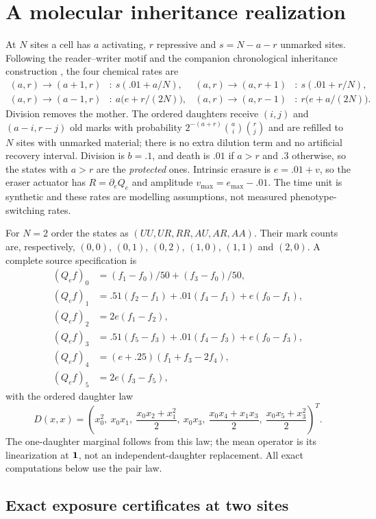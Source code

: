\section{A molecular inheritance realization}
\label{sec:source}

At $N$ sites a cell has $a$ activating, $r$ repressive and $s=N-a-r$ unmarked
sites. Following the reader--writer motif and the companion chronological
inheritance construction \citep{dodd2007,molecular}, the four chemical rates are
\begin{align}\label{eq:chem}
 (a,r)\to(a+1,r)&:\ s(.01+a/N),&
 (a,r)\to(a,r+1)&:\ s(.01+r/N),\\
 (a,r)\to(a-1,r)&:\ a\bigl(e+r/(2N)\bigr),&
 (a,r)\to(a,r-1)&:\ r\bigl(e+a/(2N)\bigr).\nonumber
\end{align}
Division removes the mother. The ordered daughters receive $(i,j)$ and
$(a-i,r-j)$ old marks with probability $2^{-(a+r)}\binom ai\binom rj$ and are
refilled to $N$ sites with unmarked material; there is no extra dilution term
and no artificial recovery interval. Division is $b=.1$, and death is $.01$ if
$a>r$ and $.3$ otherwise, so the states with $a>r$ are the \emph{protected}
ones. Intrinsic erasure is $e=.01+v$, so the eraser actuator has
$R=\partial_eQ_e$ and amplitude $v_{\max}=e_{\max}-.01$. The time unit is
synthetic and these rates are modelling assumptions, not measured
phenotype-switching rates.

For $N=2$ order the states as $(UU,UR,RR,AU,AR,AA)$. Their mark counts are,
respectively, $(0,0)$, $(0,1)$, $(0,2)$, $(1,0)$, $(1,1)$ and $(2,0)$.
A complete source specification is
\begin{align*}
 (Q_ef)_0&=(f_1-f_0)/50+(f_3-f_0)/50,\\
 (Q_ef)_1&=.51(f_2-f_1)+.01(f_4-f_1)+e(f_0-f_1),\\
 (Q_ef)_2&=2e(f_1-f_2),\\
 (Q_ef)_3&=.51(f_5-f_3)+.01(f_4-f_3)+e(f_0-f_3),\\
 (Q_ef)_4&=(e+.25)(f_1+f_3-2f_4),\\
 (Q_ef)_5&=2e(f_3-f_5),
\end{align*}
with the ordered daughter law
\[
 D(x,x)=\left(x_0^2,\ x_0x_1,\ \frac{x_0x_2+x_1^2}{2},\ x_0x_3,\
          \frac{x_0x_4+x_1x_3}{2},\ \frac{x_0x_5+x_3^2}{2}\right)^{\!T}.
\]
The one-daughter marginal follows from this law; the mean operator is its
linearization at $\mathbf1$, not an independent-daughter replacement. All exact
computations below use the pair law.

\subsection{Exact exposure certificates at two sites}
\label{sec:twosite}

